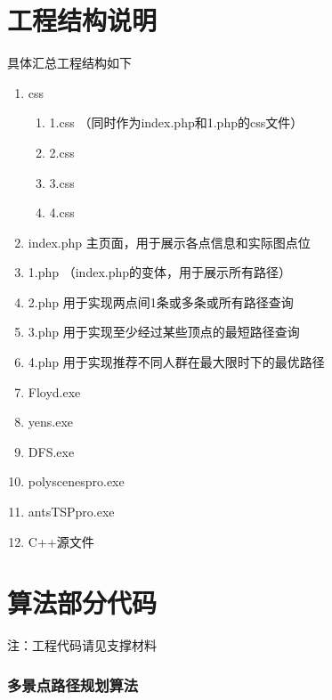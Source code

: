 \documentclass[withoutpreface,bwprint]{cumcmthesis} %
\begin{document}
\newpage
\begin{appendices}

\section{工程结构说明}

\begin{mdframed} [%
	roundcorner=5pt,
	linecolor=gray!50,
	outerlinewidth=0.5pt,
	middlelinewidth=0.3pt, backgroundcolor=gray!2,
innertopmargin=\topskip, frametitle={工程结构说明},
frametitlefont= \bfseries,frametitlerule=true,frametitlealignment =\raggedright\noindent,
frametitlerulewidth=.5pt, frametitlebackgroundcolor=gray!2,]
具体汇总工程结构如下
\begin{enumerate}
\item css \begin{enumerate}
        \item 1.css （同时作为index.php和1.php的css文件）
        \item 2.css
        \item 3.css
        \item 4.css 
    \end{enumerate}
\item index.php 主页面，用于展示各点信息和实际图点位
\item 1.php （index.php的变体，用于展示所有路径）
\item 2.php 用于实现两点间1条或多条或所有路径查询
\item 3.php 用于实现至少经过某些顶点的最短路径查询
\item 4.php 用于实现推荐不同人群在最大限时下的最优路径
\item Floyd.exe
\item yens.exe
\item DFS.exe
\item polyscenespro.exe
\item antsTSPpro.exe
\item C++源文件
\end{enumerate}
\end{mdframed}


\section{算法部分代码}

\noindent 注：工程代码请见支撑材料

\subsubsection{多景点路径规划算法}


\end{appendices}
\end{document}
